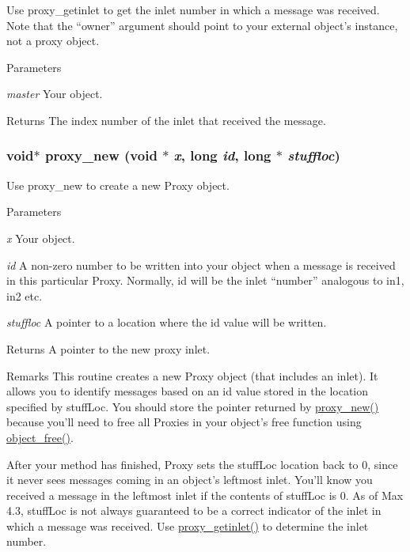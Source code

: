 Use proxy\_\-getinlet to get the inlet number in which a message was received. Note that the “owner” argument should point to your external object’s instance, not a proxy object.


\begin{DoxyParams}{Parameters}
\item[{\em master}]Your object. \end{DoxyParams}
\begin{DoxyReturn}{Returns}
The index number of the inlet that received the message. 
\end{DoxyReturn}
\hypertarget{group__inout_ga65676568dda565aba2dd13c9f88c9f91}{
\subsubsection[{proxy\_\-new}]{\setlength{\rightskip}{0pt plus 5cm}void$\ast$ proxy\_\-new (void $\ast$ {\em x}, \/  long {\em id}, \/  long $\ast$ {\em stuffloc})}}
\label{group__inout_ga65676568dda565aba2dd13c9f88c9f91}


Use proxy\_\-new to create a new Proxy object. 
\begin{DoxyParams}{Parameters}
\item[{\em x}]Your object. \item[{\em id}]A non-\/zero number to be written into your object when a message is received in this particular Proxy. Normally, id will be the inlet “number” analogous to in1, in2 etc. \item[{\em stuffloc}]A pointer to a location where the id value will be written. \end{DoxyParams}
\begin{DoxyReturn}{Returns}
A pointer to the new proxy inlet.
\end{DoxyReturn}
\begin{DoxyRemark}{Remarks}
This routine creates a new Proxy object (that includes an inlet). It allows you to identify messages based on an id value stored in the location specified by stuffLoc. You should store the pointer returned by \hyperlink{group__inout_ga65676568dda565aba2dd13c9f88c9f91}{proxy\_\-new()} because you’ll need to free all Proxies in your object’s free function using \hyperlink{group__obj_ga3759846cb356195532c41e35b87522ee}{object\_\-free()}.
\end{DoxyRemark}
After your method has finished, Proxy sets the stuffLoc location back to 0, since it never sees messages coming in an object’s leftmost inlet. You’ll know you received a message in the leftmost inlet if the contents of stuffLoc is 0. As of Max 4.3, stuffLoc is not always guaranteed to be a correct indicator of the inlet in which a message was received. Use \hyperlink{group__inout_gae81f89a78389587dc23d641e38b42481}{proxy\_\-getinlet()} to determine the inlet number. 